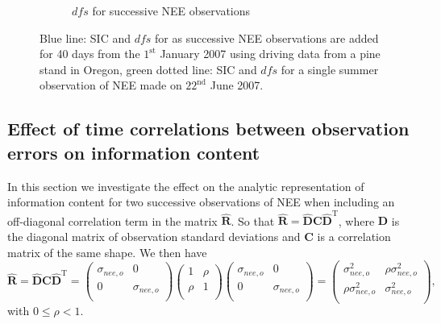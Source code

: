 \begin{figure}[ht]
\begin{subfigure}[b]{0.45\textwidth}
        \caption{\(dfs\) for successive NEE observations}
        \label{chap5:fig:dfs_succ_nee}
    \end{subfigure}
    \caption{Blue line: SIC and \(dfs\) for as successive NEE observations are added for 40 days from the \(1^{\text{st}}\) January 2007 using driving data from a pine stand in Oregon, green dotted line: SIC and \(dfs\) for a single summer observation of NEE made on \( 22^{\text{nd}} \) June 2007. }
    \label{chap5:fig:ic_succ_nee}
\end{figure}

\subsection{Effect of time correlations between observation errors on information content}

In this section we investigate the effect on the analytic representation of information content for two successive observations of NEE when including an off-diagonal correlation term in the matrix \(\hat{\mathbf{R}}\). So that \(\hat{\mathbf{R}} = \hat{\mathbf{D}}\mathbf{C}\hat{\mathbf{D}}^{\text{T}}\), where \(\hat{\mathbf{D}}\) is the diagonal matrix of observation standard deviations and \(\mathbf{C}\) is a correlation matrix of the same shape. We then have
\begin{equation}
\hat{\mathbf{R}} =  \hat{\mathbf{D}}\mathbf{C}\hat{\mathbf{D}}^{\text{T}} =
\begin{pmatrix}
\sigma_{nee,o} & 0  \\
0 & \sigma_{nee,o}  \\
\end{pmatrix}
\begin{pmatrix}
1 & \rho  \\
\rho & 1  \\
\end{pmatrix}
\begin{pmatrix}
\sigma_{nee,o} & 0  \\
0 & \sigma_{nee,o}  \\
\end{pmatrix}
=
\begin{pmatrix}
\sigma_{nee,o}^{2} & \rho\sigma_{nee,o}^{2}  \\
\rho\sigma_{nee,o}^{2} & \sigma_{nee,o}^{2}  \\
\end{pmatrix},
\end{equation}
with \(0 \leq \rho < 1\).

